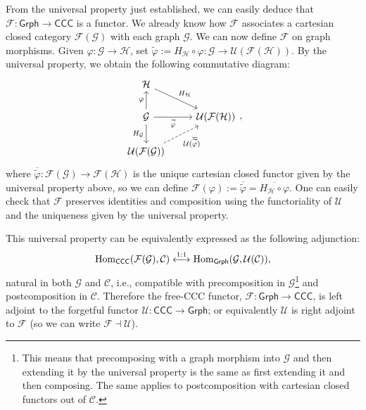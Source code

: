 \begin{remark}
    From the universal property just established, we can easily deduce that $\mathcal F : \mathsf{Grph} \to \mathsf{CCC}$ is a functor. We already know how $\mathcal F$ associates a cartesian closed category $\mathcal F(\mathcal G)$ with each graph $\mathcal G$. We can now define $\mathcal F$ on graph morphisms.
    Given $\varphi : \mathcal G \to \mathcal H$, set $\widetilde{\varphi} := H_\mathcal H \circ \varphi : \mathcal G \to \mathcal U(\mathcal F(\mathcal H))$. By the universal property, we obtain the following commutative diagram:
    \[\begin{tikzcd}
        {\mathcal H} & \\
        {\mathcal G} & {\mathcal U(\mathcal F(\mathcal H))} \\
        {\mathcal U(\mathcal F(\mathcal G))}
        \arrow["{H_{\mathcal H}}", from=1-1, to=2-2]
        \arrow["\varphi", from=2-1, to=1-1]
        \arrow["{\widetilde{\varphi}}"', from=2-1, to=2-2]
        \arrow["{H_{\mathcal G}}"', from=2-1, to=3-1]
        \arrow["{\mathcal{U}(\overline{\widetilde{\varphi}})}"', dashed, from=3-1, to=2-2]
    \end{tikzcd},\]
where $\overline{\widetilde{\varphi}} : \mathcal F(\mathcal G) \to \mathcal F(\mathcal H)$ is the unique cartesian closed functor given by the universal property above, so we can define $\mathcal F(\varphi) := \overline{\widetilde{\varphi}} = \overline{H_\mathcal H \circ \varphi}$. One can
easily check that $\mathcal F$ preserves identities and composition using the functoriality of $\mathcal U$ and the uniqueness given by the universal property.
\end{remark}

\begin{remark}
    This universal property can be equivalently expressed as the following adjunction:
    \[ \operatorname{Hom}_{\mathsf{CCC}}(\mathcal F(\mathcal G), \mathcal C) \overset{1:1}{\longleftrightarrow} \operatorname{Hom}_{\mathsf{Grph}}(\mathcal G, \mathcal U(\mathcal C)), \]
    natural in both $\mathcal G$ and $\mathcal C$, i.e., compatible with precomposition in $\mathcal G$\footnote{This means that precomposing with a graph morphism into $\mathcal G$ and then extending it by the universal property is the same as first extending it and then composing.
    The same applies to postcomposition with cartesian closed functors out of $\mathcal C$.} and postcomposition in $\mathcal C$.
    Therefore the free-CCC functor, $\mathcal F : \mathsf{Grph} \to \mathsf{CCC}$, is left adjoint to the forgetful functor $\mathcal U : \mathsf{CCC} \to \mathsf{Grph}$; or equivalently $\mathcal U$ is right adjoint to $\mathcal F$ (so we can write $\mathcal F \dashv \mathcal U$).
\end{remark}

